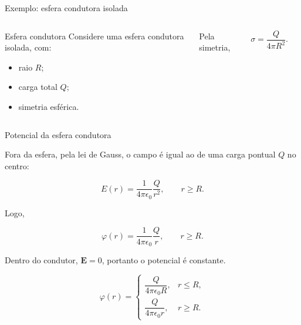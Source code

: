 \documentclass[aspectratio=169]{beamer}
\begin{document}
\begin{frame}{Exemplo: esfera condutora isolada}

\begin{columns}


\begin{mybox}{Esfera condutora}
Considere uma esfera condutora isolada, com:

\begin{itemize}
\item raio \(R\);
\item carga total \(Q\);
\item simetria esférica.
\end{itemize}
\end{mybox}

Pela simetria,

\[
\sigma=\frac{Q}{4\pi R^2}.
\]


\begin{center}
\end{center}

\end{columns}

\end{frame}

\begin{frame}{Potencial da esfera condutora}

\small

Fora da esfera, pela lei de Gauss, o campo é igual ao de uma carga pontual \(Q\)
no centro:

\[
E(r)=\frac{1}{4\pi\epsilon_0}\frac{Q}{r^2},
\qquad r\ge R.
\]

Logo,

\[
\varphi(r)=\frac{1}{4\pi\epsilon_0}\frac{Q}{r},
\qquad r\ge R.
\]

Dentro do condutor, \(\mathbf E=0\), portanto o potencial é constante.

\begin{eqbox}
\begin{equation}
\varphi(r)=
\begin{cases}
\dfrac{Q}{4\pi\epsilon_0 R},
& r\le R, \\[0.35cm]
\dfrac{Q}{4\pi\epsilon_0 r},
& r\ge R.
\end{cases}
\tag{5.2}
\label{eq:potencial-esfera-condutora}
\end{equation}
\end{eqbox}

\end{frame}
\end{document}
